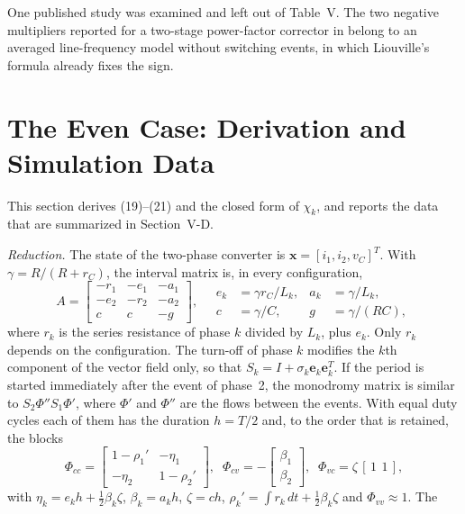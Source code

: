 \documentclass[journal]{IEEEtran}
\begin{document}
One published study was examined and left out of Table~V. The two negative
multipliers reported for a two-stage power-factor corrector in
\cite{wang2012period} belong to an averaged line-frequency model without
switching events, in which Liouville's formula already fixes the sign.

\section{The Even Case: Derivation and Simulation Data}
This section derives (19)--(21) and the closed form of $\chi_k$, and reports
the data that are summarized in Section~V-D.

\emph{Reduction.} The state of the two-phase converter is
$\bm{x}=[i_1,i_2,v_C]^{T}$. With $\gamma=R/(R+r_C)$, the interval matrix
is, in every configuration,
\begin{equation*}
A=\begin{bmatrix}-r_1&-e_1&-a_1\\-e_2&-r_2&-a_2\\c&c&-g\end{bmatrix},
\quad
\begin{aligned}
e_k&=\gamma r_C/L_k,& a_k&=\gamma/L_k,\\
c&=\gamma/C,& g&=\gamma/(RC),
\end{aligned}
\end{equation*}
where $r_k$ is the series resistance of phase $k$ divided by $L_k$, plus
$e_k$. Only $r_k$ depends on the configuration. The turn-off of phase $k$
modifies the $k$th component of the vector field only, so that
$S_k=I+\sigma_k\bm{e}_k\bm{e}_k^{T}$. If the period is started immediately
after the event of phase~2, the monodromy matrix is similar to
$S_2\Phi''S_1\Phi'$, where $\Phi'$ and $\Phi''$ are the flows between the
events. With equal duty cycles each of them has the duration $h=T/2$ and,
to the order that is retained, the blocks
\begin{equation*}
\Phi_{cc}=\begin{bmatrix}1-\rho_1'&-\eta_1\\-\eta_2&1-\rho_2'\end{bmatrix},\;\;
\Phi_{cv}=-\begin{bmatrix}\beta_1\\\beta_2\end{bmatrix},\;\;
\Phi_{vc}=\zeta\,[\,1\ \,1\,],
\end{equation*}
with $\eta_k=e_kh+\tfrac12\beta_k\zeta$, $\beta_k=a_kh$, $\zeta=ch$,
$\rho_k'=\int r_k\,dt+\tfrac12\beta_k\zeta$ and $\Phi_{vv}\approx1$. The
\end{document}
